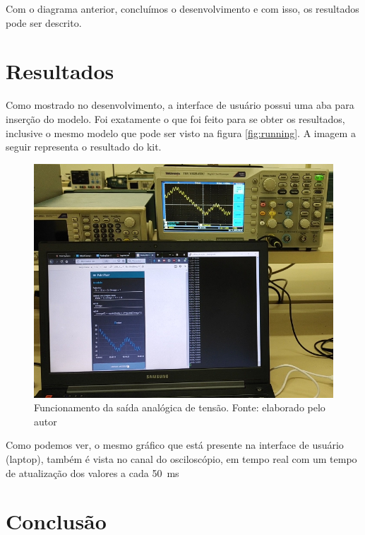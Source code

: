 \documentclass[journal]{IEEEtranTIE}
\begin{document}
Com o diagrama anterior, concluímos o desenvolvimento e com isso, os resultados pode ser descrito.


\section{Resultados}

Como mostrado no desenvolvimento, a interface de usuário possui uma aba para inserção do modelo. Foi exatamente o que foi feito para se obter os resultados, inclusive o mesmo modelo que pode ser visto na figura \ref{fig:running}. A imagem a seguir representa o resultado do kit.

\begin{figure}[!h]
	\includegraphics[width=\linewidth]{img/real_running.png}
    \caption{Funcionamento da saída analógica de tensão. Fonte: elaborado pelo autor}
    \label{fig:real}
\end{figure}

Como podemos ver, o mesmo gráfico que está presente na interface de usuário (laptop), também é vista no canal do osciloscópio, em tempo real com um tempo de atualização dos valores a cada \SI{50}{\milli\second}



\section{Conclusão}
\end{document}
